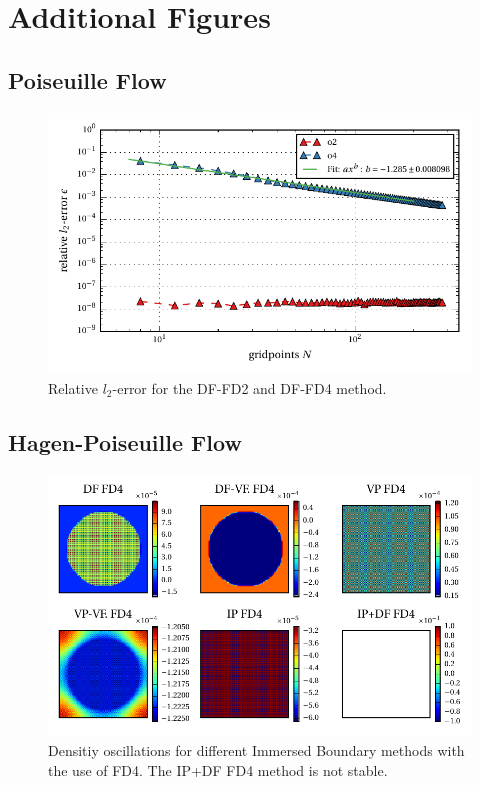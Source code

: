 \chapter{Additional Figures}

\section{Poiseuille Flow}
\begin{figure}[!h]
    \centering
    \includegraphics{gfx/immersed_boundary/poiseuille_flow/3_df/relative_l2error.pdf}
    \caption{Relative $l_2$-error for the DF-FD2 and DF-FD4 method.}
    \label{fig:vali_pflow_3gc}
\end{figure}

\clearpage

\section{Hagen-Poiseuille Flow}

\begin{figure}[!h]
  \centering
  \includegraphics{gfx/immersed_boundary/hpflow/long/rho.pdf}
  \caption{Densitiy oscillations for different Immersed Boundary methods with the use of FD4. The IP+DF FD4 method is not stable.}
    \label{fig:hpflow_allgc_theo}
\end{figure}
\clearpage

